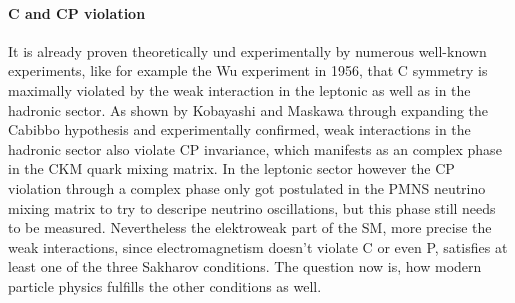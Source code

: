 \paragraph{C and CP violation}
It is already proven theoretically und experimentally by numerous well-known experiments, like for example the Wu experiment in 1956, that C symmetry is maximally violated by the weak interaction in the leptonic as well as in the hadronic sector. As shown by Kobayashi and Maskawa through expanding the Cabibbo hypothesis and experimentally confirmed, weak interactions in the hadronic sector also violate CP invariance, which manifests as an complex phase in the CKM quark mixing matrix. In the leptonic sector however the CP violation through a complex phase only got postulated in the PMNS neutrino mixing matrix to try to descripe neutrino oscillations, but this phase still needs to be measured.\newline
Nevertheless the elektroweak part of the SM, more precise the weak interactions, since electromagnetism doesn't violate C or even P, satisfies at least one of the three Sakharov conditions. The question now is, how modern particle physics fulfills the other conditions as well. \newline

